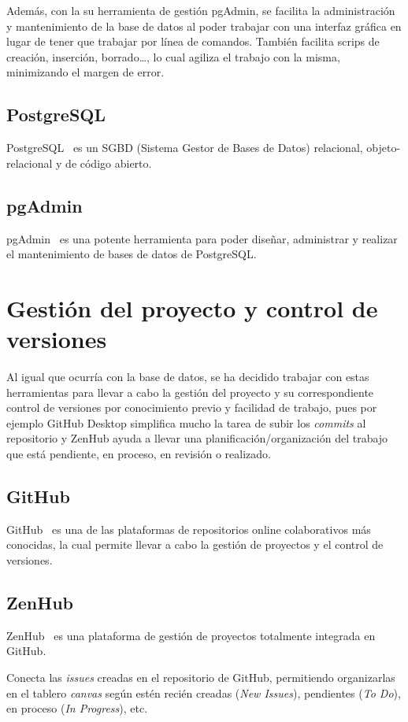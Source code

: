 Además, con la su herramienta de gestión pgAdmin, se facilita la administración y mantenimiento de la base de datos al poder trabajar con una interfaz gráfica en lugar de tener que trabajar por línea de comandos. También facilita scrips de creación, inserción, borrado\dots, lo cual agiliza el trabajo con la misma, minimizando el margen de error.

\subsection{PostgreSQL}
PostgreSQL~\cite{pagina_postgresql} es un SGBD (Sistema Gestor de Bases de Datos) relacional, objeto-relacional y de código abierto.

\subsection{pgAdmin}
pgAdmin~\cite{pagina_pgAdmin} es una potente herramienta para poder diseñar, administrar y realizar el mantenimiento de bases de datos de PostgreSQL.

\section{Gestión del proyecto y control de versiones}
Al igual que ocurría con la base de datos, se ha decidido trabajar con estas herramientas para llevar a cabo la gestión del proyecto y su correspondiente control de versiones por conocimiento previo y facilidad de trabajo, pues por ejemplo GitHub Desktop simplifica mucho la tarea de subir los \textit{commits} al repositorio y ZenHub ayuda a llevar una planificación/organización del trabajo que está pendiente, en proceso, en revisión o realizado.

\subsection{GitHub}
GitHub~\cite{pagina_github} es una de las plataformas de repositorios online colaborativos más conocidas, la cual permite llevar a cabo la gestión de proyectos y el control de versiones.

\subsection{ZenHub}
ZenHub~\cite{pagina_zenhub} es una plataforma de gestión de proyectos totalmente integrada en GitHub. 

Conecta las \textit{issues} creadas en el repositorio de GitHub, permitiendo organizarlas en el tablero \textit{canvas} según estén recién creadas (\textit{New Issues}), pendientes (\textit{To Do}), en proceso (\textit{In Progress}), etc.

